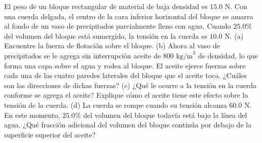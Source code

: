 \item El peso de un bloque rectangular de material de baja densidad es $15.0 \text{ N}$. Con una cuerda delgada, el centro de la cara inferior horizontal del bloque se amarra al fondo de un vaso de precipitados parcialmente lleno con agua. Cuando $25.0\%$ del volumen del bloque está sumergido, la tensión en la cuerda es $10.0 \text{ N}$. (a) Encuentre la fuerza de flotación sobre el bloque. (b) Ahora al vaso de precipitados se le agrega sin interrupción aceite de $800 \text{ kg/m}^3$ de densidad, lo que forma una capa sobre el agua y rodea al bloque. El aceite ejerce fuerzas sobre cada una de las cuatro paredes laterales del bloque que el aceite toca. ¿Cuáles son las direcciones de dichas fuerzas? (c) ¿Qué le ocurre a la tensión en la cuerda conforme se agrega el aceite? Explique cómo el aceite tiene este efecto sobre la tensión de la cuerda. (d) La cuerda se rompe cuando su tensión alcanza $60.0 \text{ N}$. En este momento, $25.0\%$ del volumen del bloque todavía está bajo la línea del agua. ¿Qué fracción adicional del volumen del bloque continúa por debajo de la superficie superior del aceite?

